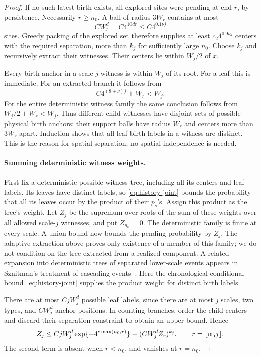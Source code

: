 \begin{proof}
If no such latest birth exists, all explored sites were pending at end
$r$, by persistence.  Necessarily $r\ge n_0$.  A ball of radius $3W_r$
contains at most
\[
 C W_r^d=C4^{10dr}\le C4^{0.1\nu j}
\]
sites.  Greedy packing of the explored set therefore supplies at least
$c_2 4^{0.9\nu j}$ centers with the required separation, more than $k_j$
for sufficiently large $n_0$.  Choose $k_j$ and recursively extract their
witnesses.  Their centers lie within $W_j/2$ of $x$.

Every birth anchor in a scale-$j$ witness is within $W_j$ of its root.
For a leaf this is immediate.  For an extracted branch it follows from
\[
 C4^{(8+\nu)j}+W_r<W_j.
\]
For the entire deterministic witness family the same conclusion follows
from $W_j/2+W_r<W_j$.  Thus different child witnesses have disjoint sets
of possible physical birth anchors: their support balls have radius $W_r$
and centers more than $3W_r$ apart.  Induction shows that all leaf birth
labels in a witness are distinct.  This is the reason for spatial
separation; no spatial independence is needed.

\paragraph{Summing deterministic witness weights.}
First fix a deterministic possible witness tree, including all its
centers and leaf labels. Its leaves have distinct labels, so
\eqref{eq:history-joint} bounds the probability that all its leaves occur
by the product of their $p_s$'s. Assign this product as the tree's weight.
Let $Z_j$ be the supremum over roots of the sum of these weights over
all allowed scale-$j$ witnesses, and put $Z_{n_0}=0$. The deterministic
family is finite at every scale. A union bound now bounds the pending
probability by $Z_j$. The adaptive extraction above proves only existence
of a member of this family; we do not condition on the tree extracted
from a realized component. A related expansion into deterministic trees
of separated lower-scale events appears in Sznitman's treatment of
cascading events~\cite[Definition~3.1 and proof of Theorem~3.4]{Sznitman2012}.
Here the chronological conditional bound~\eqref{eq:history-joint}
supplies the product weight for distinct birth labels.

There are at most $CjW_j^d$ possible leaf labels, since
there are at most $j$ scales, two types, and $CW_j^d$ anchor positions.
In counting branches, order the child centers and discard their separation
constraint to obtain an upper bound.  Hence
\begin{equation}
 Z_j\le CjW_j^d\exp\{-4^{c\max(n_0,r)}\}
       +(CW_j^d Z_r)^{k_j},
 \qquad r=\lfloor\alpha_{\rm h} j\rfloor.
 \label{eq:history-recursion}
\end{equation}
The second term is absent when $r<n_0$, and vanishes at $r=n_0$.


\end{proof}
